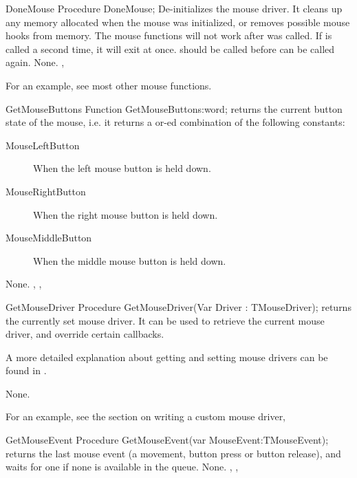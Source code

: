 
\begin{procedure}{DoneMouse}
\Declaration
Procedure DoneMouse;
\Description
{} De-initializes the mouse driver. It cleans up any memory
allocated when the mouse was initialized, or removes possible mouse hooks
from memory. The mouse functions will not work after  was
called. If  is called a second time, it will exit at once.
 should be called before  can be called again.
\Errors
None.
\SeeAlso
{}, 
\end{procedure}

For an example, see most other mouse functions.

\begin{function}{GetMouseButtons}
\Declaration
Function GetMouseButtons:word;
\Description
{} returns the current button state of the mouse, i.e.
it returns a or-ed combination of the following constants:
\begin{description}
\item[MouseLeftButton] When the left mouse button is held down.
\item[MouseRightButton] When the right mouse button is held down.
\item[MouseMiddleButton] When the middle mouse button is held down.
\end{description}
\Errors
None.
\SeeAlso
{}, , 
\end{function}


\begin{procedure}{GetMouseDriver}
\Declaration
Procedure GetMouseDriver(Var Driver : TMouseDriver);
\Description
{} returns the currently set mouse driver. It can be used
to retrieve the current mouse driver, and override certain callbacks.

A more detailed explanation about getting and setting mouse drivers can be found in
.

\Errors
None.
\SeeAlso
{}
\end{procedure}

For an example, see the section on writing a custom mouse driver,

\begin{procedure}{GetMouseEvent}
\Declaration
Procedure GetMouseEvent(var MouseEvent:TMouseEvent);
\Description
{} returns the last mouse event (a movement, button press or
button release), and waits for one if none is available in the queue.
\Errors
None.
\SeeAlso
{}, , 
\end{procedure}

